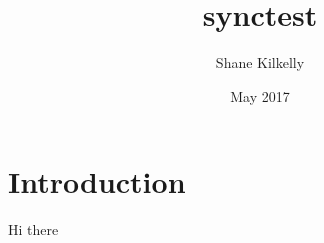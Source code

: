 \documentclass{article}
\title{synctest}
\author{Shane Kilkelly}
\date{May 2017}
\begin{document}
\maketitle

\section{Introduction}


Hi
there
\end{document}
